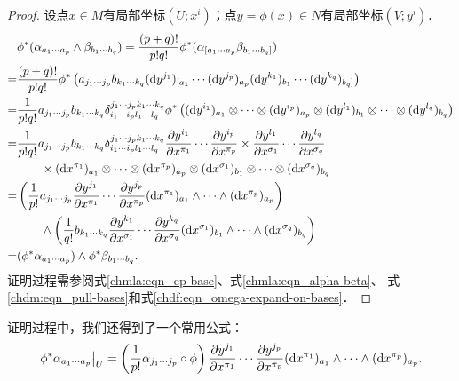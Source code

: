 \begin{proof}
    设点$x\in M$有局部坐标$(U;x^i)$；点$y=\phi(x)\in N$有局部坐标$(V;y^i)$．
    \begin{align*}
        & \phi^{*}(\alpha_{a_1\cdots a_p} \wedge \beta_{b_1\cdots b_q}) =
           \frac{(p+q)!}{p! q!} \phi^{*}(\alpha_{[a_1\cdots a_p} \beta_{b_1\cdots b_q]} ) \\
        =& \frac{(p+q)!}{p! q!} \phi^{*}\left(
           a_{j_1\cdots j_p} b_{k_1\cdots k_q}
           ({\rm d}y^{j_1})_{[a_1}  \cdots  ({\rm d}y^{j_p})_{a_p}
           ({\rm d}y^{k_1})_{b_1}  \cdots  ({\rm d}y^{k_q})_{b_q]} \right) \\
        =& \frac{1}{p! q!} a_{j_1\cdots j_p} b_{k_1\cdots k_q}
           \delta^{j_1 \cdots j_p k_1 \cdots k_q}_{i_1 \cdots i_p l_1 \cdots l_q}
           \phi^{*}\left(
             ({\rm d}y^{i_1})_{a_1} \otimes \cdots \otimes ({\rm d}y^{i_p})_{a_p} \otimes
             ({\rm d}y^{l_1})_{b_1} \otimes \cdots \otimes ({\rm d}y^{l_q})_{b_q} \right) \\
        =& \frac{1}{p! q!} a_{j_1\cdots j_p} b_{k_1\cdots k_q}
           \delta^{j_1 \cdots j_p k_1 \cdots k_q}_{i_1 \cdots i_p l_1 \cdots l_q}
           \frac{\partial y^{i_1} }{\partial x^{\pi_1} } \cdots
           \frac{\partial y^{i_p} }{\partial x^{\pi_p} } \times
           \frac{\partial y^{l_1} }{\partial x^{\sigma_1} } \cdots
           \frac{\partial y^{l_q} }{\partial x^{\sigma_q} } \\
           & \qquad \times
           ({\rm d}x^{\pi_1})_{a_1} \otimes \cdots \otimes ({\rm d}x^{\pi_p})_{a_p} \otimes
           ({\rm d}x^{\sigma_1})_{b_1} \otimes \cdots \otimes ({\rm d}x^{\sigma_q})_{b_q}  \\
        =& \left( \frac{1}{p!} a_{j_1\cdots j_p}
           \frac{\partial y^{j_1} }{\partial x^{\pi_1} } \cdots
           \frac{\partial y^{j_p} }{\partial x^{\pi_p} }
           ({\rm d}x^{\pi_1})_{a_1} \wedge \cdots \wedge ({\rm d}x^{\pi_p})_{a_p} \right) \\
          & \qquad \wedge \left(\frac{1}{q!} b_{k_1\cdots k_q}
            \frac{\partial y^{k_1} }{\partial x^{\sigma_1} } \cdots
           \frac{\partial y^{k_q} }{\partial x^{\sigma_q} }
           ({\rm d}x^{\sigma_1})_{b_1} \wedge \cdots \wedge ({\rm d}x^{\sigma_q})_{b_q} \right)  \\
         =&   (\phi^{*}\alpha_{a_1\cdots a_p} ) \wedge \phi^{*}\beta_{b_1\cdots b_q} .
    \end{align*}
    证明过程需参阅式\eqref{chmla:eqn_ep-base}、式\eqref{chmla:eqn_alpha-beta}、
    式\eqref{chdm:eqn_pull-bases}和式\eqref{chdf:eqn_omega-expand-on-bases}．
\end{proof}
证明过程中，我们还得到了一个常用公式：
\begin{equation}\label{chdf:eqn_fsalpha}
    \left. \phi^{*}\alpha_{a_1\cdots a_p} \right|_U =
      \left(\frac{1}{p!} \alpha_{j_1\cdots j_p} \circ \phi \right) 
    \frac{\partial y^{j_1} }{\partial x^{\pi_1} } \cdots
    \frac{\partial y^{j_p} }{\partial x^{\pi_p} } 
    ({\rm d}x^{\pi_1})_{a_1} \wedge \cdots \wedge ({\rm d}x^{\pi_p})_{a_p} .
\end{equation}


